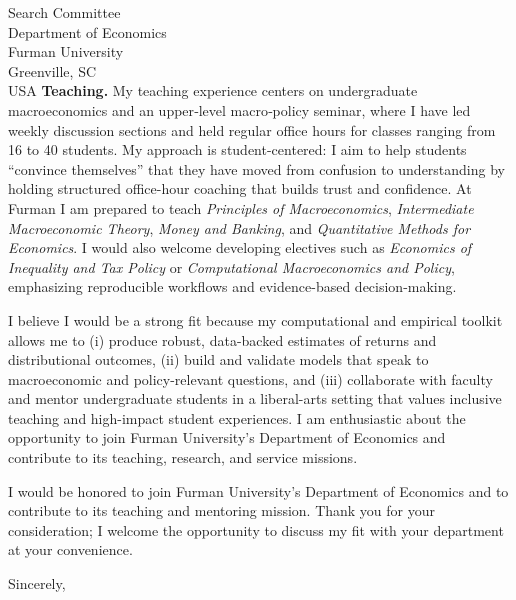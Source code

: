 \documentclass[11pt,letterpaper]{letter}
\begin{document}
\begin{letter}{Search Committee \\
Department of Economics \\
Furman University \\
Greenville, SC \\ USA}
\textbf{Teaching.} My teaching experience centers on undergraduate macroeconomics and an upper‐level macro‐policy seminar, where I have led weekly discussion sections and held regular office hours for classes ranging from 16 to 40 students. My approach is student-centered: I aim to help students “convince themselves” that they have moved from confusion to understanding by holding structured office-hour coaching that builds trust and confidence. At Furman I am prepared to teach \textit{Principles of Macroeconomics}, \textit{Intermediate Macroeconomic Theory}, \textit{Money and Banking}, and \textit{Quantitative Methods for Economics}. I would also welcome developing electives such as \textit{Economics of Inequality and Tax Policy} or \textit{Computational Macroeconomics and Policy}, emphasizing reproducible workflows and evidence-based decision-making.

I believe I would be a strong fit because my computational and empirical toolkit allows me to (i) produce robust, data-backed estimates of returns and distributional outcomes, (ii) build and validate models that speak to macroeconomic and policy-relevant questions, and (iii) collaborate with faculty and mentor undergraduate students in a liberal-arts setting that values inclusive teaching and high-impact student experiences. I am enthusiastic about the opportunity to join Furman University’s Department of Economics and contribute to its teaching, research, and service missions.

I would be honored to join Furman University’s Department of Economics and to contribute to its teaching and mentoring mission. Thank you for your consideration; I welcome the opportunity to discuss my fit with your department at your convenience.

\closing{Sincerely,}

\end{letter}
\end{document}
